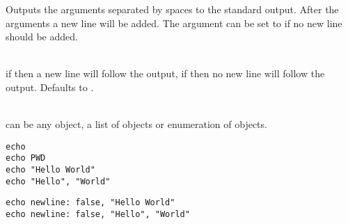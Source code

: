%


Outputs the arguments separated by spaces to the standard output. After 
the arguments a new line will be added. The argument  can be set
to  if no new line should be added.

\begin{asparadesc}
%
\item[\code{newline: true|false}]  \hfill \\
if  then a new line will follow the output,
if  then no new line will follow the output. Defaults to .
%
\item[\code{arguments\dots}]  \hfill \\
can be any object, a list of objects or enumeration of objects.
%
\end{asparadesc}

\begin{lstlisting}[style=Groovybash, label={lst:example_echo1}, title={%
Print the message to the standard output with an additional line break.}]
echo
echo PWD
echo "Hello World"
echo "Hello", "World"
\end{lstlisting}

\begin{lstlisting}[style=Groovybash, label={lst:example_echo2}, title={%
Print the message to the standard output with surpressed line break.}]
echo newline: false, "Hello World"
echo newline: false, "Hello", "World"
\end{lstlisting}

